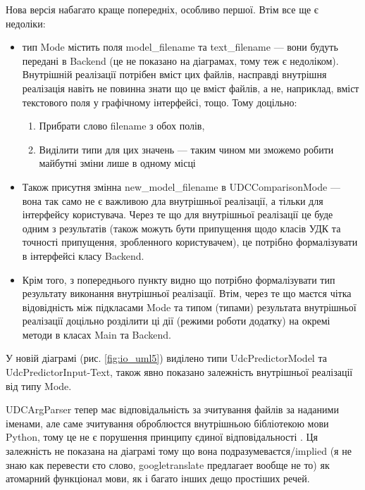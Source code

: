 \documentclass[14pt]{extarticle}
\begin{document}
  Нова версія набагато краще попередніх, особливо першої.
  Втім все ще є недоліки:
  \begin{itemize}[labelindent=\dimexpr{}\relax, leftmargin=*]
    \item тип Mode містить поля model\_filename та text\_filename
    --- вони будуть передані в Backend
    (це не показано на діаграмах, тому теж є недоліком).
    Внутрішній реалізації потрібен вміст цих файлів,
    насправді внутрішня реалізація навіть не повинна знати що це вміст файлів,
    а не, наприклад, вміст текстового поля у графічному інтерфейсі, тощо.
    Тому доцільно:
      \begin{enumerate}[labelindent=\dimexpr\parindent\relax, leftmargin=*]
        \item Прибрати слово filename з обох полів,
        \item Виділити типи для цих значень ---
        таким чином ми зможемо робити майбутні зміни лише в одному місці
        \cite{Code_complete_5_3}
      \end{enumerate}
    \item Також присутня змінна new\_model\_filename в UDCComparisonMode ---
    вона так само не є важливою дла внутрішньої реалізації,
    а тільки для інтерфейсу користувача.
    Через те що для внутрішньої реалізації це буде одним з результатів
    (також можуть бути припущення щодо класів УДК та точності припущення,
    зробленного користувачем),
    це потрібно формалізувати в інтерфейсі класу Backend.
    \item Крім того, з попереднього пункту видно
    що потрібно формалізувати тип результату виконання внутрішньої реалізації.
    Втім, через те що маєтся чітка відовідність між підкласами Mode
    та типом (типами) результата внутрішньої реалізації доцільно розділити
    ці дії (режими роботи додатку) на окремі методи в класах Main та Backend.
  \end{itemize}

  У новій діаграмі (рис. \ref{fig:io_uml5})
  виділено типи UdcPredictorModel та UdcPredictorInput-Text,
  також явно показано залежність внутрішньої реалізації від типу Mode.

  UDCArgParser тепер має відповідальність
  за зчитування файлів за наданими іменами,
  але саме зчитування оброблюєтся внутрішньою бібліотекою мови Python,
  тому це не є порушення принципу єдиної відповідальності \cite{SRP_wiki}.
  Ця залежність не показана на діаграмі тому що вона подразумеваєтся/implied
  (я не знаю как перевести єто слово, googletranslate предлагает вообще не то)
  як атомарний функціонал мови, як і багато інших дещо простіших речей.
\end{document}
